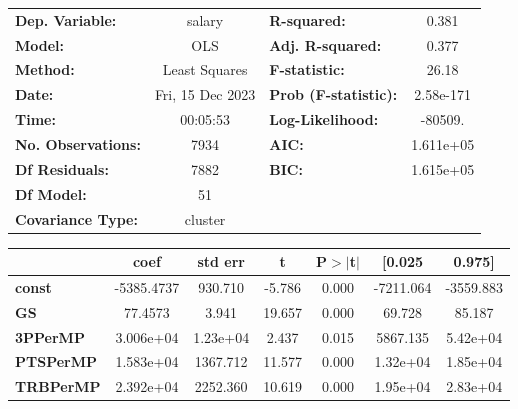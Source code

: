 \begin{center}
\begin{tabular}{lclc}
\toprule
\textbf{Dep. Variable:}       &      salary      & \textbf{  R-squared:         } &     0.381   \\
\textbf{Model:}               &       OLS        & \textbf{  Adj. R-squared:    } &     0.377   \\
\textbf{Method:}              &  Least Squares   & \textbf{  F-statistic:       } &     26.18   \\
\textbf{Date:}                & Fri, 15 Dec 2023 & \textbf{  Prob (F-statistic):} & 2.58e-171   \\
\textbf{Time:}                &     00:05:53     & \textbf{  Log-Likelihood:    } &   -80509.   \\
\textbf{No. Observations:}    &        7934      & \textbf{  AIC:               } & 1.611e+05   \\
\textbf{Df Residuals:}        &        7882      & \textbf{  BIC:               } & 1.615e+05   \\
\textbf{Df Model:}            &          51      & \textbf{                     } &             \\
\textbf{Covariance Type:}     &     cluster      & \textbf{                     } &             \\
\bottomrule
\end{tabular}
\begin{tabular}{lcccccc}
                              & \textbf{coef} & \textbf{std err} & \textbf{t} & \textbf{P$> |$t$|$} & \textbf{[0.025} & \textbf{0.975]}  \\
\midrule
\textbf{const}                &   -5385.4737  &      930.710     &    -5.786  &         0.000        &    -7211.064    &    -3559.883     \\
\textbf{GS}                   &      77.4573  &        3.941     &    19.657  &         0.000        &       69.728    &       85.187     \\
\textbf{3PPerMP}              &    3.006e+04  &     1.23e+04     &     2.437  &         0.015        &     5867.135    &     5.42e+04     \\
\textbf{PTSPerMP}             &    1.583e+04  &     1367.712     &    11.577  &         0.000        &     1.32e+04    &     1.85e+04     \\
\textbf{TRBPerMP}             &    2.392e+04  &     2252.360     &    10.619  &         0.000        &     1.95e+04    &     2.83e+04     \\

\end{tabular}
\end{center}
